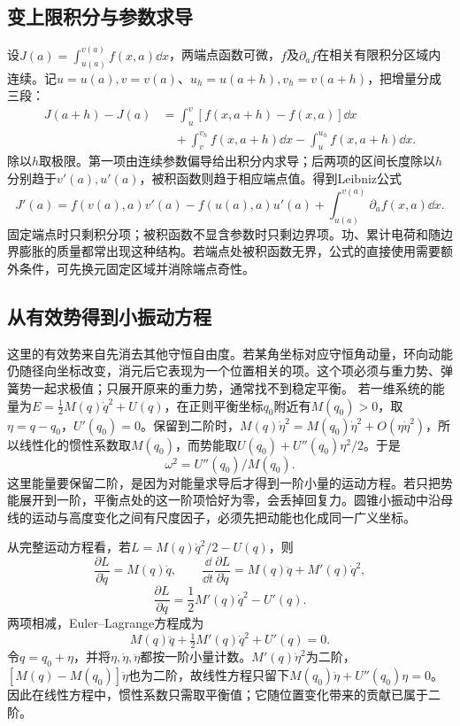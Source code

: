 \subsection{变上限积分与参数求导}
设$J(a)=\int_{u(a)}^{v(a)}f(x,a)\dd x$，两端点函数可微，$f$及$\partial_af$在相关有限积分区域内连续。记$u=u(a),v=v(a)$、$u_h=u(a+h),v_h=v(a+h)$，把增量分成三段：
\[\begin{aligned}
J(a+h)-J(a)
&=\int_u^v[f(x,a+h)-f(x,a)]\dd x\\
&\quad+\int_v^{v_h}f(x,a+h)\dd x
-\int_u^{u_h}f(x,a+h)\dd x.
\end{aligned}\]
除以$h$取极限。第一项由连续参数偏导给出积分内求导；后两项的区间长度除以$h$分别趋于$v'(a),u'(a)$，被积函数则趋于相应端点值。得到Leibniz公式
\[\boxed{J'(a)=f(v(a),a)v'(a)-f(u(a),a)u'(a)+\int_{u(a)}^{v(a)}\partial_af(x,a)\dd x}.
\]
固定端点时只剩积分项；被积函数不显含参数时只剩边界项。功、累计电荷和随边界膨胀的质量都常出现这种结构。若端点处被积函数无界，公式的直接使用需要额外条件，可先换元固定区域并消除端点奇性。

\subsection{从有效势得到小振动方程}

这里的有效势来自先消去其他守恒自由度。若某角坐标对应守恒角动量，环向动能仍随径向坐标改变，消元后它表现为一个位置相关的项。这个项必须与重力势、弹簧势一起求极值；只展开原来的重力势，通常找不到稳定平衡。
若一维系统的能量为$E=\frac12M(q)\dot q^2+U(q)$，在正则平衡坐标$q_0$附近有$M(q_0)>0$，取$\eta=q-q_0$，$U'(q_0)=0$。保留到二阶时，$M(q)\dot\eta^2=M(q_0)\dot\eta^2+O(\eta\dot\eta^2)$，所以线性化的惯性系数取$M(q_0)$，而势能取$U(q_0)+U''(q_0)\eta^2/2$。于是
\[\omega^2=U''(q_0)/M(q_0).
\]
这里能量要保留二阶，是因为对能量求导后才得到一阶小量的运动方程。若只把势能展开到一阶，平衡点处的这一阶项恰好为零，会丢掉回复力。圆锥小振动中沿母线的运动与高度变化之间有尺度因子，必须先把动能也化成同一广义坐标。

从完整运动方程看，若$L=M(q)\dot q^2/2-U(q)$，则
\[\frac{\partial L}{\partial\dot q}=M(q)\dot q,\qquad
\frac{\dd}{\dd t}\frac{\partial L}{\partial\dot q}
=M(q)\ddot q+M'(q)\dot q^2,\]
\[\frac{\partial L}{\partial q}=\frac12M'(q)\dot q^2-U'(q).\]
两项相减，Euler--Lagrange方程成为
\[M(q)\ddot q+\tfrac12M'(q)\dot q^2+U'(q)=0.\]
令$q=q_0+\eta$，并将$\eta,\dot\eta,\ddot\eta$都按一阶小量计数。$M'(q)\dot\eta^2$为二阶，$[M(q)-M(q_0)]\ddot\eta$也为二阶，故线性方程只留下$M(q_0)\ddot\eta+U''(q_0)\eta=0$。因此在线性方程中，惯性系数只需取平衡值；它随位置变化带来的贡献已属于二阶。

